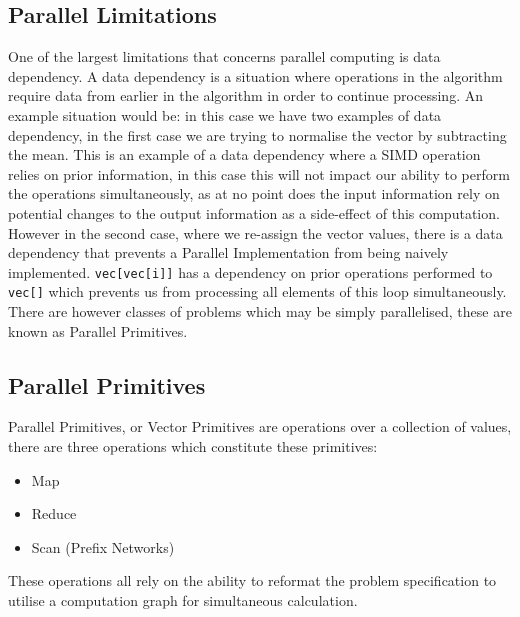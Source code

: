 \subsection{Parallel Limitations} 
One of the largest limitations that concerns parallel computing is data dependency. A data
dependency is a situation where operations in the algorithm require data from earlier in the
algorithm in order to continue processing. An example situation would be:
 in this case we have two examples of data dependency, in
the first case we are trying to normalise the vector by subtracting the mean. This is an example of
a data dependency where a SIMD operation relies on prior information, in this case this will not
impact our ability to perform the operations simultaneously, as at no point does the input
information rely on potential changes to the output information as a side-effect of this
computation. However in the second case, where we re-assign the vector values, there is a data
dependency that prevents a Parallel Implementation from being naively implemented.
\lstinline{vec[vec[i]]} has a dependency on prior operations performed to \lstinline{vec[]} which
prevents us from processing all elements of this loop simultaneously. There are however classes of
problems which may be simply parallelised, these are known as Parallel Primitives.

\subsection{Parallel Primitives}
Parallel Primitives, or Vector Primitives are operations over a collection of values, there are
three operations which constitute these primitives:
\begin{itemize}
    \item Map
    \item Reduce
    \item Scan (Prefix Networks)
\end{itemize}
These operations all rely on the ability to reformat the problem specification to utilise a
computation graph for simultaneous calculation.


